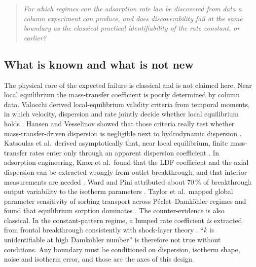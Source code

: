 \documentclass[11pt]{article}
\begin{document}
\begin{quote}
\emph{For which regimes can the adsorption rate law be discovered from data a column
experiment can produce, and does discoverability fail at the same boundary as the
classical practical identifiability of the rate constant, or earlier?}
\end{quote}

\subsection*{What is known and what is not new}
\label{sec:notnew}
The physical core of the expected failure is classical and is not claimed here. Near
local equilibrium the mass-transfer coefficient is poorly determined by column data.
Valocchi derived local-equilibrium validity criteria from temporal moments, in which
velocity, dispersion and rate jointly decide whether local equilibrium holds
\citep{valocchi1985}. Hansen and Vesselinov showed that those criteria really test
whether mass-transfer-driven dispersion is negligible next to hydrodynamic dispersion
\citep{hansen2017}. Katsoulas et al.\ derived asymptotically that, near local
equilibrium, finite mass-transfer rates enter only through an apparent dispersion
coefficient \citep{katsoulas2023}. In adsorption engineering, Knox et al.\ found that the
LDF coefficient and the axial dispersion can be extracted wrongly from outlet
breakthrough, and that interior measurements are needed \citep{knox2016}. Ward and Pini
attributed about 70\,\% of breakthrough output variability to the isotherm parameters
\citep{ward2022}. Taylor et al.\ mapped global parameter sensitivity of sorbing transport
across P\'eclet--Damk\"ohler regimes and found that equilibrium sorption dominates
\citep{taylor2026}. The counter-evidence is also classical. In the constant-pattern
regime, a lumped rate coefficient \emph{is} extracted from frontal breakthrough
consistently with shock-layer theory \citep{miyabe2000}. ``$k$ is unidentifiable at high
Damk\"ohler number'' is therefore not true without conditions. Any boundary must be
conditioned on dispersion, isotherm shape, noise and isotherm error, and those are the
axes of this design.
\end{document}
